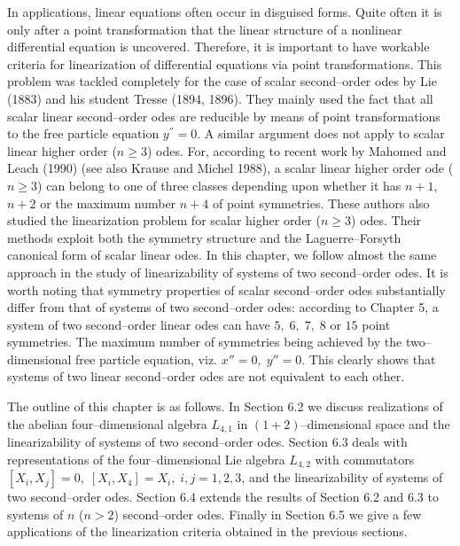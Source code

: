 In applications, linear equations often occur in disguised forms.
Quite often  it is only after a point transformation that the linear 
structure of a nonlinear differential equation is uncovered. Therefore, it is  
important to have workable criteria for linearization of differential 
equations via point transformations. This problem was tackled 
completely for the case of
scalar second--order odes by Lie (1883) and his student Tresse (1894, 1896).
They mainly used the fact that all scalar linear second--order odes
are reducible by
means of point transformations to the free particle equation $y^{''}=0$. 
A similar argument does not  apply to scalar linear higher order ($n\ge 3$)
odes. For, according to recent work by Mahomed and Leach (1990)
(see also Krause and Michel 1988), a scalar
linear higher order ode ($n\ge 3$) can belong to one of three 
classes depending upon whether it has $n+1$, $n+2$ or the maximum number
$n+4$ of point symmetries. These authors also studied the linearization 
problem for scalar higher order ($n\ge3$) odes. Their methods exploit both
the symmetry structure and the Laguerre--Forsyth canonical form of scalar
linear odes. In this chapter, we follow almost the same approach in the study 
of linearizability of systems of two second--order odes. It is worth noting
that symmetry properties of scalar second--order odes substantially
differ from that of
systems of two second--order odes: according to Chapter 5, a system of
two second--order linear  odes can have $5,\;6,\;7,\;8$ or
$15$ point symmetries. The maximum number of symmetries being achieved  by the
two--dimensional free particle equation, viz. $x''=0,\;y''=0$.
This clearly shows that systems of two linear second--order odes are not
equivalent to each other.

The outline of this chapter is as follows. In Section 6.2 we
discuss realizations of the abelian four--dimensional algebra $L_{4,1}$ in
$(1+2)$--dimensional space and the linearizability of systems of two
second--order odes. Section 6.3 deals with representations of the
four--dimensional Lie
algebra $L_{4,2}$ with commutators $[X_i,X_j]=0,\;[X_i,X_4]=X_i,
\;i,j=1,2,3$, and  the linearizability of systems 
of two second--order odes. Section 6.4  extends the results of
Section 6.2 and 6.3  to
systems of $n$ ($n > 2$) second--order odes.
Finally in Section 6.5 we give a few applications
of the linearization criteria obtained in the previous sections.

